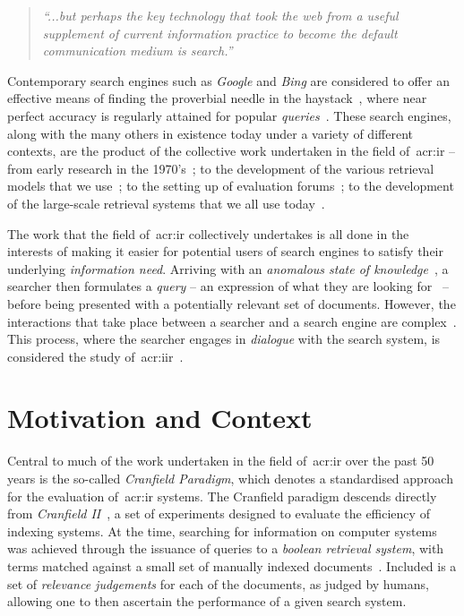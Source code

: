 \begin{quote}
    \emph{``...but perhaps the key technology that took the web from a useful supplement of current information practice to become the default communication medium is search.''}
\end{quote}

Contemporary search engines such as \emph{Google} and \emph{Bing} are considered to offer an effective means of finding the proverbial needle in the haystack~\citep{wilson2010keyword_search}, where near perfect accuracy is regularly attained for popular \emph{queries}~\citep{vaughan2004new_measurements}. These search engines, along with the many others in existence today under a variety of different contexts, are the product of the collective work undertaken in the field of~\gls{acr:ir} -- from early research in the 1970's~\citep{cleverdon1962cranfield_experiments,rijsbergen1979ir}; to the development of the various retrieval models that we use~\citep{robertson2009probabilistic_models}; to the setting up of evaluation forums~\citep{harman1993trec1}; to the development of the large-scale retrieval systems that we all use today~\citep{baezayates1999modern_ir, wang2010language_models}.

The work that the field of~\gls{acr:ir} collectively undertakes is all done in the interests of making it easier for potential users of search engines to satisfy their underlying \emph{information need}. Arriving with an \emph{anomalous state of knowledge}~\citep{belkin1980ask}, a searcher then formulates a \emph{query} -- an expression of what they are looking for~\citep{borlund2003iir_model} -- before being presented with a potentially relevant set of documents. However, the interactions that take place between a searcher and a search engine are complex~\citep{ingwersen2005theturn}. This process, where the searcher engages in \emph{dialogue} with the search system, is considered the study of~\gls{acr:iir}~\citep{borlund2003iir_model}.

\section{Motivation and Context}\label{sec:intro:motivation}
Central to much of the work undertaken in the field of~\gls{acr:ir} over the past 50 years is the so-called \emph{Cranfield Paradigm}, which denotes a standardised approach for the evaluation of~\gls{acr:ir} systems. The Cranfield paradigm descends directly from \emph{Cranfield II}~\citep{aslib1966factors}, a set of experiments designed to evaluate the efficiency of indexing systems. At the time, searching for information on computer systems was achieved through the issuance of queries to a \emph{boolean retrieval system}, with terms matched against a small set of manually indexed documents~\citep{harman2010cranfield}. Included is a set of \emph{relevance judgements} for each of the documents, as judged by humans, allowing one to then ascertain the performance of a given search system.

